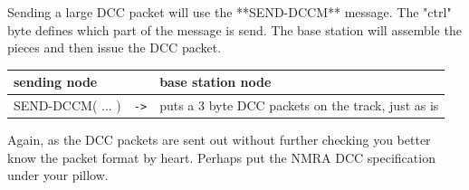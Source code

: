 Sending a large DCC packet will use the **SEND-DCCM** message. The "ctrl" byte defines which part of the message is send. The base station will assemble the pieces and then issue the DCC packet. 

\begin{table}[ht!]
    \begin{center}
        \begin{tabular}{|p{}| c |p{}|}
            \toprule
            \textbf{sending node} & & \textbf{ base station node} \\
            \midrule
            SEND-DCCM( ... ) & \texttt{->} & puts a 3 byte DCC packets on the track, just as is \\
            \bottomrule
        \end{tabular}
    \end{center}
\end{table}

Again, as the DCC packets are sent out without further checking you better know the packet format by heart. Perhaps put the NMRA DCC specification under your pillow.


